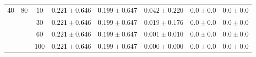 \documentclass{article}
\begin{document}
\begin{table}[!ht]
\begin{center}
\begin{tabular}{cccccccc}
  \multirow{4}{*}{40} &\multirow{4}{*}{80}  &$10$    &$0.221\pm0.646$ &$0.199\pm0.647$  &$0.042\pm0.220$ &$0.0\pm0.0$ &$0.0\pm0.0$ \\ %
     &       &$30$   &$0.221\pm0.646$ &$0.199\pm0.647$ &$0.019\pm0.176$ &$0.0\pm0.0$ &$0.0\pm0.0$\\ %
     &       &$60$   &$0.221\pm0.646$ &$0.199\pm0.647$ &$0.001\pm0.010$ &$0.0\pm0.0$ &$0.0\pm0.0$\\
     &       &$100$  &$0.221\pm0.646$ &$0.199\pm0.647$ &$0.000\pm0.000$ &$0.0\pm0.0$ &$0.0\pm0.0$\\ \hline
    
\end{tabular}
\end{center}
\end{table}




    
\end{document}
